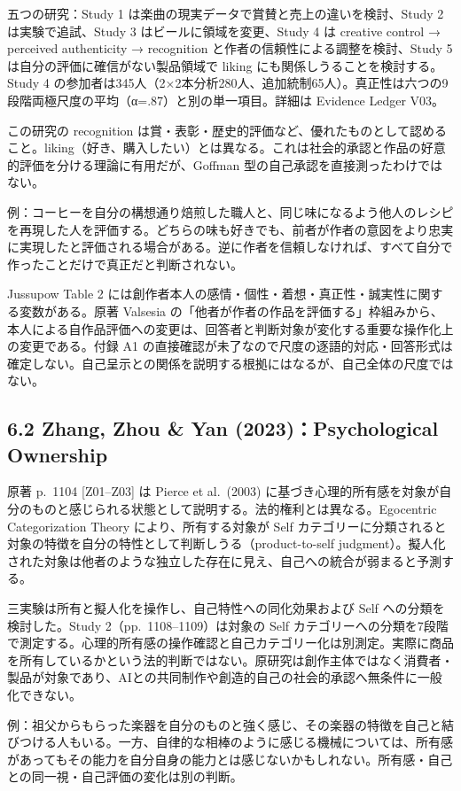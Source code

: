 \documentclass[
  11pt,
  a4paper,
]{article}
\begin{document}
五つの研究：Study 1 は楽曲の現実データで賞賛と売上の違いを検討、Study 2
は実験で追試、Study 3 はビールに領域を変更、Study 4 は creative control
→ perceived authenticity → recognition
と作者の信頼性による調整を検討、Study 5
は自分の評価に確信がない製品領域で liking
にも関係しうることを検討する。Study 4
の参加者は345人（2×2本分析280人、追加統制65人）。真正性は六つの9段階両極尺度の平均（α=.87）と別の単一項目。詳細は
Evidence Ledger V03。

この研究の recognition
は賞・表彰・歴史的評価など、優れたものとして認めること。liking（好き、購入したい）とは異なる。これは社会的承認と作品の好意的評価を分ける理論に有用だが、Goffman
型の自己承認を直接測ったわけではない。

例：コーヒーを自分の構想通り焙煎した職人と、同じ味になるよう他人のレシピを再現した人を評価する。どちらの味も好きでも、前者が作者の意図をより忠実に実現したと評価される場合がある。逆に作者を信頼しなければ、すべて自分で作ったことだけで真正だと判断されない。

Jussupow Table 2
には創作者本人の感情・個性・着想・真正性・誠実性に関する変数がある。原著
Valsesia
の「他者が作者の作品を評価する」枠組みから、本人による自作品評価への変更は、回答者と判断対象が変化する重要な操作化上の変更である。付録
A1
の直接確認が未了なので尺度の逐語的対応・回答形式は確定しない。自己呈示との関係を説明する根拠にはなるが、自己全体の尺度ではない。

\subsection{6.2 Zhang, Zhou \& Yan (2023)：Psychological
Ownership}\label{zhang-zhou-yan-2023psychological-ownership}

原著 p.~1104 {[}Z01--Z03{]} は Pierce et al.~(2003)
に基づき心理的所有感を対象が自分のものと感じられる状態として説明する。法的権利とは異なる。Egocentric
Categorization Theory により、所有する対象が Self
カテゴリーに分類されると対象の特徴を自分の特性として判断しうる（product-to-self
judgment）。擬人化された対象は他者のような独立した存在に見え、自己への統合が弱まると予測する。

三実験は所有と擬人化を操作し、自己特性への同化効果および Self
への分類を検討した。Study 2（pp.~1108--1109）は対象の Self
カテゴリーへの分類を7段階で測定する。心理的所有感の操作確認と自己カテゴリー化は別測定。実際に商品を所有しているかという法的判断ではない。原研究は創作主体ではなく消費者・製品が対象であり、AIとの共同制作や創造的自己の社会的承認へ無条件に一般化できない。

例：祖父からもらった楽器を自分のものと強く感じ、その楽器の特徴を自己と結びつける人もいる。一方、自律的な相棒のように感じる機械については、所有感があってもその能力を自分自身の能力とは感じないかもしれない。所有感・自己との同一視・自己評価の変化は別の判断。
\end{document}
